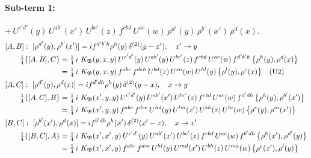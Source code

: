 \documentclass[10pt]{article}
\numberwithin{equation}{section}
\begin{document}
\paragraph{Sub-term 1:} $+\,U^{c'd'}(y)\,U^{ab'}(x')\,U^{bc'}(z)\,f^{cbd}\,U^{ac}(w)\,\rho^{d'}(y)\,\rho^{b'}(x')\,\rho^{d}(x)$.
\begin{align}
&[A,B]:\ [\rho^{d'}(y),\rho^{b'}(x')]=i f^{d'b'h}\rho^{h}(y)\,\delta^{(2)}(y-x'),\quad x'\to y\notag\\
&\qquad \tfrac14\{[A,B],C\}=\tfrac14\,i\,\,K_{\mathfrak B}(y,x,y)\,U^{c'd'}(y)\,U^{ab'}(y)\,U^{bc'}(z)\,f^{cbd}\,U^{ac}(w)\,f^{d'b'h}\,\big\{\rho^{h}(y),\rho^{d}(x)\big\}\notag\\
&\qquad\phantom{\tfrac14\{[A,B],C\}}=\tfrac14\,i\,\,K_{\mathfrak B}(y,x,y)\,f^{abc}\,f^{deh}\,U^{bd}(z)\,U^{ea}(w)\,U^{hl}(y)\,\big\{\rho^{l}(y),\rho^{c}(x)\big\}\quad\text{(U2)}
\label{eq:GIII.II-1-AB}\\
&[A,C]:\ [\rho^{d'}(y),\rho^{d}(x)]=i f^{d'dh}\rho^{h}(y)\,\delta^{(2)}(y-x),\quad x\to y\notag\\
&\qquad \tfrac14\{[A,C],B\}=\tfrac14\,i\,\,K_{\mathfrak B}(x',y,y)\,U^{c'd'}(y)\,U^{ab'}(x')\,U^{bc'}(z)\,f^{cbd}\,U^{ac}(w)\,f^{d'dh}\,\big\{\rho^{h}(y),\rho^{b'}(x')\big\}\notag\\
&\qquad\phantom{\tfrac14\{[A,C],B\}}=\tfrac14\,i\,\,K_{\mathfrak B}(x',y,y)\,f^{abc}\,f^{dce}\,U^{hd}(y)\,U^{lm}(x')\,U^{bh}(z)\,U^{la}(w)\,\big\{\rho^{e}(y),\rho^{m}(x')\big\}
\label{eq:GIII.II-1-AC}\\
&[B,C]:\ [\rho^{b'}(x'),\rho^{d}(x)]=i f^{b'dh}\rho^{h}(x')\,\delta^{(2)}(x'-x),\quad x\to x'\notag\\
&\qquad \tfrac14\{[B,C],A\}=\tfrac14\,i\,\,K_{\mathfrak B}(x',x',y)\,U^{c'd'}(y)\,U^{ab'}(x')\,U^{bc'}(z)\,f^{cbd}\,U^{ac}(w)\,f^{b'dh}\,\big\{\rho^{h}(x'),\rho^{d'}(y)\big\}\notag\\
&\qquad\phantom{\tfrac14\{[B,C],A\}}=\tfrac14\,i\,\,K_{\mathfrak B}(x',x',y)\,f^{abc}\,f^{dce}\,U^{hl}(y)\,U^{md}(x')\,U^{bh}(z)\,U^{ma}(w)\,\big\{\rho^{e}(x'),\rho^{l}(y)\big\}
\label{eq:GIII.II-1-BC}
\end{align}
\end{document}
